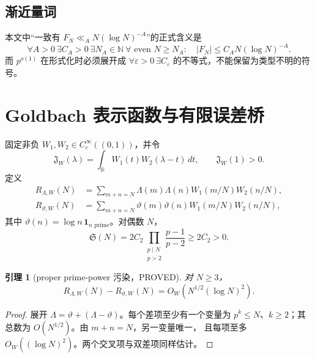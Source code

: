 \documentclass[11pt,a4paper]{ctexart}
\newtheorem{lemma}[theorem]{引理}
\theoremstyle{definition}
\newcommand{\1}{\mathbf 1}
\newcommand{\PROVED}{\textcolor{green!40!black}{\textsf{PROVED}}}
\begin{document}
\subsection{渐近量词}

本文中“一致有 $F_N\ll_A N(\log N)^{-A}$”的正式含义是
\[
 \forall A>0\ \exists C_A>0\ \exists N_A\in\mathbb N\ 
 \forall\text{ even }N\ge N_A:\quad
 |F_N|\le C_A N(\log N)^{-A}.                       \tag{N.5}
\]
而 $p^{o(1)}$ 在形式化时必须展开成
$\forall\varepsilon>0\ \exists C_\varepsilon$ 的不等式，不能保留为类型不明的符号。

\section{Goldbach 表示函数与有限误差桥}
\label{sec:goldbach-bridge}

固定非负 $W_1,W_2\in C_c^\infty((0,1))$，并令
\[
 \mathfrak J_W(\lambda)=\int_{\mathbb R}W_1(t)W_2(\lambda-t)\,dt,
 \qquad \mathfrak J_W(1)>0.                         \tag{GB.1}
\]
定义
\begin{align}
 R_{\Lambda,W}(N)&=\sum_{m+n=N}\Lambda(m)\Lambda(n)
 W_1(m/N)W_2(n/N),                                  \tag{GB.2}\\
 R_{\vartheta,W}(N)&=\sum_{m+n=N}\vartheta(m)\vartheta(n)
 W_1(m/N)W_2(n/N),                                  \tag{GB.3}
\end{align}
其中 $\vartheta(n)=\log n\,\1_{n\text{ prime}}$。对偶数 $N$，
\[
 \mathfrak S(N)=2C_2\prod_{\substack{p\mid N\\p>2}}\frac{p-1}{p-2}
 \ge 2C_2>0.                                        \tag{GB.4}
\]

\begin{lemma}[proper prime-power 污染，\PROVED]
对 $N\ge3$，
\[
 R_{\Lambda,W}(N)-R_{\vartheta,W}(N)
 =O_W\!\left(N^{1/2}(\log N)^2\right).              \tag{GB.5}
\]
\end{lemma}
\begin{proof}
展开 $\Lambda=\vartheta+(\Lambda-\vartheta)$。每个差项至少有一个变量为
$p^k\le N$、$k\ge2$；其总数为 $O(N^{1/2})$。由 $m+n=N$，另一变量唯一，
且每项至多 $O_W((\log N)^2)$。两个交叉项与双差项同样估计。
\end{proof}
\end{document}
